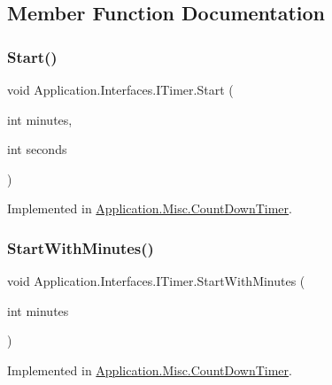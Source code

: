 \subsection{Member Function Documentation}
\mbox{\label{interface_application_1_1_interfaces_1_1_i_timer_a127e73defb495fef00e24cdc0f73936e}} 
\subsubsection{\texorpdfstring{Start()}{Start()}}
{\footnotesize\ttfamily void Application.\+Interfaces.\+I\+Timer.\+Start (\begin{DoxyParamCaption}\item[{int}]{minutes,  }\item[{int}]{seconds }\end{DoxyParamCaption})}



Implemented in \mbox{\hyperlink{class_application_1_1_misc_1_1_count_down_timer_a287fe196667f4c6aca7fb14506f14916}{Application.\+Misc.\+Count\+Down\+Timer}}.

\mbox{\label{interface_application_1_1_interfaces_1_1_i_timer_af2759fd575f1ae0a8df31f753bfeaf07}} 
\subsubsection{\texorpdfstring{Start\+With\+Minutes()}{StartWithMinutes()}}
{\footnotesize\ttfamily void Application.\+Interfaces.\+I\+Timer.\+Start\+With\+Minutes (\begin{DoxyParamCaption}\item[{int}]{minutes }\end{DoxyParamCaption})}



Implemented in \mbox{\hyperlink{class_application_1_1_misc_1_1_count_down_timer_a46a066ed728519a096d6e47a9df080a3}{Application.\+Misc.\+Count\+Down\+Timer}}.

